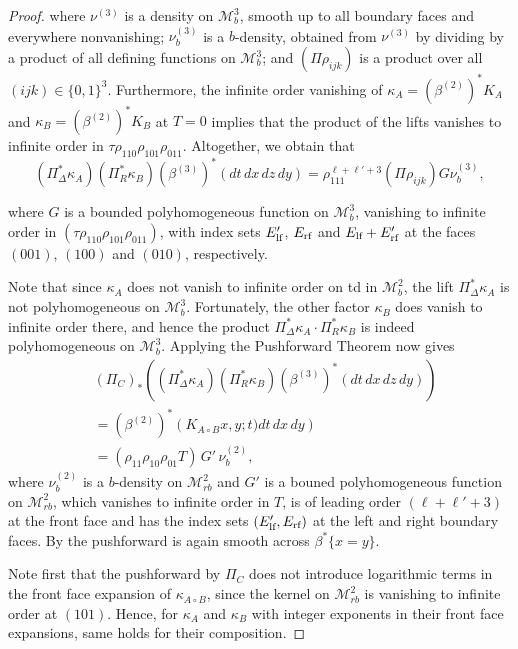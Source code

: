 \begin{proof}
where $\nu^{(3)}$ is a density on $\mathscr{M}^3_b$, smooth up to all boundary faces and everywhere 
nonvanishing; $\nu^{(3)}_b$ is a $b$-density, obtained from $\nu^{(3)}$ by dividing 
by a product of all defining functions on $\mathscr{M}^3_b$; 
and $\left( \Pi \rho_{ijk} \right)$ is a product over all $(ijk)\in \{0,1\}^3$. 
Furthermore, the infinite order vanishing of $\kappa_A= (\beta^{(2)})^* K_A$ and 
$\kappa_B =  (\beta^{(2)})^* K_B$ at $T=0$ 
implies that the product of the lifts
vanishes to infinite order in $\tau \rho_{110} \rho_{101} \rho_{011}$. Altogether, we obtain that
\[
\left(\Pi_\Delta^*\kappa_A\right) \left(\Pi_R^*\kappa_B\right) (\beta^{(3)})^* (dt \, dx \, dz \, dy)  
 =\rho_{111}^{\ell + \ell' + 3} \left( \Pi \rho_{ijk} \right) G \nu_b^{(3)},
\]

where $G$ is a bounded polyhomogeneous function on $\mathscr{M}^3_b$, 
vanishing to infinite order in $(\tau \rho_{110} \rho_{101} \rho_{011})$, 
with index sets $E'_{\textup{lf}}$, $E_{\textup{rf}}$ and $E_{\textup{lf}} + E'_{\textup{rf}}$ 
at the faces $(001)$, $(100)$ and $(010)$, respectively. 

Note that since $\kappa_A$ does not vanish to infinite order on td in $\mathscr{M}^2_b$, 
the lift $\Pi_\Delta^* \kappa_A$ is not polyhomogeneous
on $\mathscr{M}^3_b$. Fortunately, the other factor $\kappa_B$ 
does vanish to infinite order there, and hence the product 
$\Pi_\Delta^*\kappa_A \cdot \Pi_R^*\kappa_B$ is indeed polyhomogeneous 
on $\mathscr{M}^3_b$. Applying the Pushforward Theorem now gives
\begin{equation}
\begin{split}
&\left(\Pi_C\right)_*\left(\left(\Pi_\Delta^*\kappa_A\right) \left(\Pi_R^*\kappa_B\right) 
(\beta^{(3)})^* (dt \, dx \, dz \, dy)\right) \\
& = \left(\beta^{(2)}\right)^*\left(K_{A\circ B}x,y;t)dt \, dx \, dy\right) \\
&= (\rho_{11} \rho_{10} \rho_{01} T) \, G' \, \nu^{(2)}_b,
\end{split}
\label{lift3}
\end{equation}
where $\nu^{(2)}_b$ is a $b$-density on $\mathscr{M}^2_{rb}$ 
and $G'$ is a bouned polyhomogeneous function on $\mathscr{M}^2_{rb}$, 
which vanishes to infinite order in $T$, is of leading order $(\ell + \ell'+3)$ at 
the front face and has the index sets $(E'_{\textup{lf}}, E_{\textup{rf}})$ 
at the left and right boundary faces. By \cite[Proposition B7.20]{EMM:ROT} the 
pushforward is again smooth across $\beta^*\{x=y\}$.

Note first that the pushforward by $\Pi_C$ does not introduce logarithmic 
terms in the front face expansion of $\kappa_{A\circ B}$, since 
the kernel on $\mathscr{M}^2_{rb}$ is vanishing to infinite order at $(101)$. 
Hence, for $\kappa_A$ and $\kappa_B$ with integer exponents in their front face expansions, 
same holds for their composition.


\end{proof}

